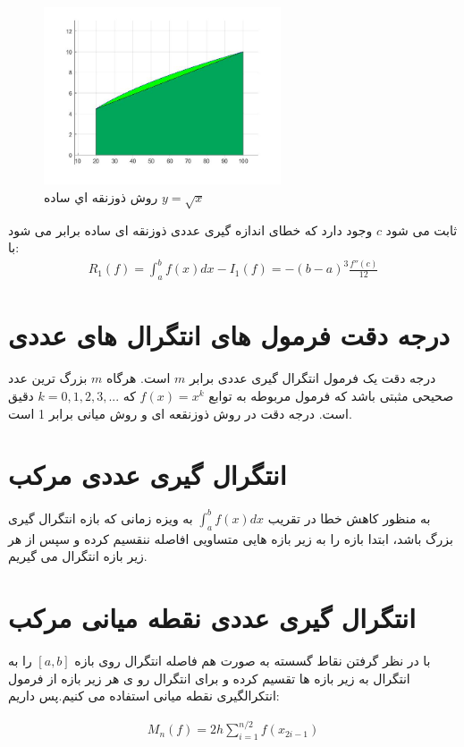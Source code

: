 \documentclass{article}
\begin{document}
\begin{figure}[!h]
    \centering
\includegraphics[width=7cm]{pic34codeIntegral.jpg}
    \caption{ روش ذوزنقه اي ساده $y=\sqrt x$ }
    \label{fig:انتگرال خط}
\end{figure}
 ثابت می شود $c$
وجود دارد که خطای اندازه گیری عددی ذوزنقه ای ساده برابر می شود با:
\\
\begin{align*}
    R_{1}(f) = \int_a^{b} f(x) dx - I_{1}(f) = -(b-a)^3\frac{f''(c)}{12}
\end{align*}


\section{درجه دقت فرمول های انتگرال های عددی}
درجه دقت یک فرمول انتگرال گیری عددی برابر $m$
است. هرگاه $m$
بزرگ ترین عدد صحیحی مثبتی باشد که فرمول مربوطه به توابع 
$f(x) = x^k$
که
$k=0,1,2,3,...$
دقیق است.
درجه دقت در روش ذوزنقعه ای و روش میانی برابر 1 است.
\citep{Numerical_integration}
\section{انتگرال گیری عددی مرکب}
به منظور کاهش خطا در تقریب 
$\int_a^{b} f(x) dx $
به ویزه زمانی که بازه انتگرال گیری بزرگ باشد،
ابتدا بازه را به زیر بازه هایی متساویی افاصله ننقسیم کرده و سپس 
از هر زیر بازه انتگرال می گیریم.
\citep{Numerical_integration}

\section{انتگرال گیری عددی نقطه میانی مرکب}
با در نظر گرفتن نقاط گسسته به صورت هم فاصله
انتگرال روی بازه $[a,b]$
را به انتگرال به زیر بازه ها تقسیم کرده و برای انتگرال رو ی هر زیر بازه از فرمول انتکرالگیری نقطه میانی استفاده می کنیم.پس داریم:


\begin{align*}
    M_{n}(f) = 2h \sum_{i=1}^{n/2} f(x_{2i-1})
\end{align*}
\end{document}
